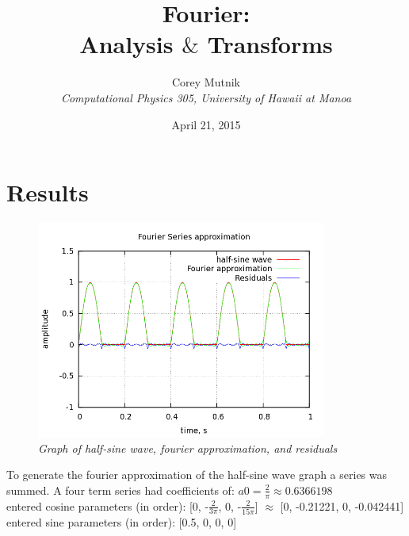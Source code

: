 \documentclass[11pt]{article}
\begin{document}
\pagestyle{myheadings}


\title{Fourier:\\
Analysis $\&$ Transforms}


\author{Corey Mutnik \\
{\it Computational Physics 305, University of Hawaii at Manoa} }


\date{April 21, 2015}

\maketitle   



\section*{Results}
\begin{figure}[H]
  \begin{center}
\centerline{\includegraphics[width=3.75in]{halfsinewave.png}}
\caption{\it \small{Graph of half-sine wave, fourier approximation, and residuals \label{fig1}}}
  \end{center}
\end{figure}

To generate the fourier approximation of the half-sine wave graph a series was summed.  
A four term series had coefficients of: $a0 = \frac{2}{\pi} \approx 0.6366198$\\
entered cosine parameters (in order): [0, -$\frac{2}{3\pi}$, 0, -$\frac{2}{15\pi}$] $\approx$ [0, -0.21221, 0, -0.042441]\\
entered sine parameters (in order): [0.5, 0, 0, 0]
\end{document}

